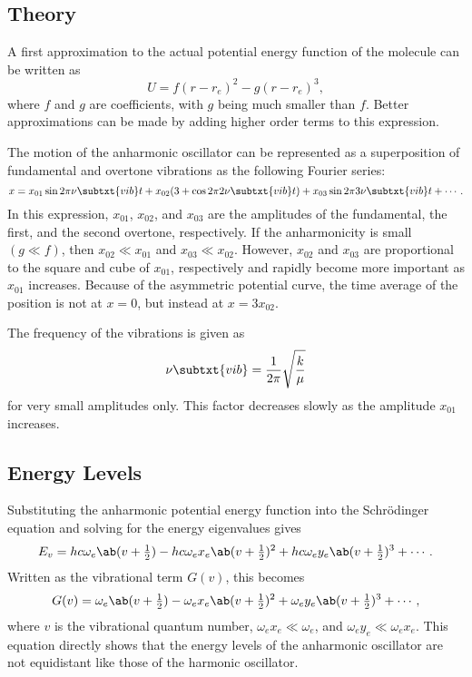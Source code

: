\subsection{Theory}

A first approximation to the actual potential energy function of the molecule can be written as
\begin{equation*}
    U = f(r - r_e)^2 - g(r - r_e)^3,
\end{equation*}
where $f$ and $g$ are coefficients, with $g$ being much smaller than $f$. Better approximations can be made by adding higher order terms to this expression.

The motion of the anharmonic oscillator can be represented as a superposition of fundamental and overtone vibrations as the following Fourier series:
\begin{equation*}
    x = x_{01}\sin{2\pi\nu\subtxt{vib}t} + x_{02}(3 + \cos{2\pi2\nu\subtxt{vib}t}) + x_{03}\sin{2\pi3\nu\subtxt{vib}t} + \dotsb.
\end{equation*}
In this expression, $x_{01}$, $x_{02}$, and $x_{03}$ are the amplitudes of the fundamental, the first, and the second overtone, respectively. If the anharmonicity is small $(g \ll f)$, then $x_{02} \ll x_{01}$ and $x_{03} \ll x_{02}$. However, $x_{02}$ and $x_{03}$ are proportional to the square and cube of $x_{01}$, respectively and rapidly become more important as $x_{01}$ increases. Because of the asymmetric potential curve, the time average of the position is not at $x = 0$, but instead at $x = 3x_{02}$.

The frequency of the vibrations is given as
\begin{equation*}
    \nu\subtxt{vib} = \frac{1}{2\pi}\sqrt{\frac{k}{\mu}}
\end{equation*}
for very small amplitudes only. This factor decreases slowly as the amplitude $x_{01}$ increases.

\subsection{Energy Levels}

Substituting the anharmonic potential energy function into the Schr\"odinger equation and solving for the energy eigenvalues gives
\begin{equation*}
    E_v = hc\omega_e\ab(v + \tfrac{1}{2}) - hc\omega_ex_e\ab(v + \tfrac{1}{2})^2 + hc\omega_ey_e\ab(v + \tfrac{1}{2})^3 + \dotsb.
\end{equation*}
Written as the vibrational term $G(v)$, this becomes
\begin{equation*}
    G(v) = \omega_e\ab(v + \tfrac{1}{2}) - \omega_ex_e\ab(v + \tfrac{1}{2})^2 + \omega_ey_e\ab(v + \tfrac{1}{2})^3 + \dotsb,
\end{equation*}
where $v$ is the vibrational quantum number, $\omega_ex_e \ll \omega_e$, and $\omega_ey_e \ll \omega_ex_e$. This equation directly shows that the energy levels of the anharmonic oscillator are not equidistant like those of the harmonic oscillator.

